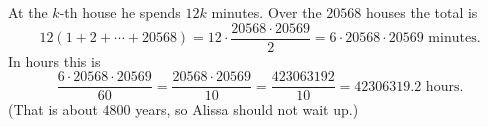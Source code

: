 At the $k$-th house he spends $12k$ minutes. Over the $20568$ houses the total is
\[
12(1+2+\cdots+20568)=12\cdot\dfrac{20568\cdot20569}{2}=6\cdot20568\cdot20569\text{ minutes}.
\]
In hours this is
\[
\dfrac{6\cdot20568\cdot20569}{60}=\dfrac{20568\cdot20569}{10}=\dfrac{423063192}{10}=\boxed{42306319.2}\text{ hours}.
\]
(That is about $4800$ years, so Alissa should not wait up.)
